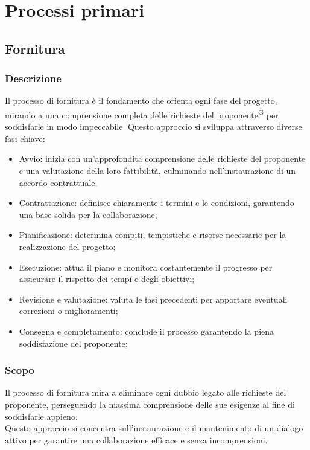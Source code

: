 \documentclass[5pt]{article}
\begin{document}
\section{Processi primari}

\subsection{Fornitura}

\subsubsection{Descrizione}

Il processo di fornitura è il fondamento che orienta ogni fase del progetto, mirando a una comprensione completa delle richieste del proponente\textsuperscript{G} per soddisfarle in modo impeccabile. Questo approccio si sviluppa attraverso diverse fasi chiave:
\begin{itemize}
    \item{Avvio:} inizia con un'approfondita comprensione delle richieste del proponente e una valutazione della loro fattibilità, culminando nell'instaurazione di un accordo contrattuale;
    \item{Contrattazione:} definisce chiaramente i termini e le condizioni, garantendo una base solida per la collaborazione;
    \item{Pianificazione:} determina compiti, tempistiche e risorse necessarie per la realizzazione del progetto;
    \item{Esecuzione:} attua il piano e monitora costantemente il progresso per assicurare il rispetto dei tempi e degli obiettivi;
    \item{Revisione e valutazione:} valuta le fasi precedenti per apportare eventuali correzioni o miglioramenti;
    \item{Consegna e completamento:} conclude il processo garantendo la piena soddisfazione del proponente;
\end{itemize}

\subsubsection{Scopo}

Il processo di fornitura mira a eliminare ogni dubbio legato alle richieste del proponente, perseguendo la massima comprensione delle sue esigenze al fine di soddisfarle appieno.\\
Questo approccio si concentra sull'instaurazione e il mantenimento di un dialogo attivo per garantire una collaborazione efficace e senza incomprensioni.
\end{document}
